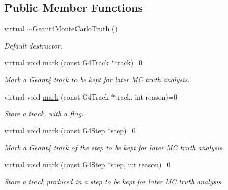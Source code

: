 \subsection*{Public Member Functions}
\begin{DoxyCompactItemize}
\item 
virtual \hyperlink{class_d_d4hep_1_1_simulation_1_1_geant4_monte_carlo_truth_acc1f5693c904777e8470b7df290d1c2c}{$\sim$Geant4MonteCarloTruth} ()
\begin{DoxyCompactList}\small\item\em Default destructor. \item\end{DoxyCompactList}\item 
virtual void \hyperlink{class_d_d4hep_1_1_simulation_1_1_geant4_monte_carlo_truth_ad74253c38fb6e00003b591a07e5e748d}{mark} (const G4Track $\ast$track)=0
\begin{DoxyCompactList}\small\item\em Mark a Geant4 track to be kept for later MC truth analysis. \item\end{DoxyCompactList}\item 
virtual void \hyperlink{class_d_d4hep_1_1_simulation_1_1_geant4_monte_carlo_truth_a6b63ab3d0ac424aba1088fb9ea2994dc}{mark} (const G4Track $\ast$track, int reason)=0
\begin{DoxyCompactList}\small\item\em Store a track, with a flag. \item\end{DoxyCompactList}\item 
virtual void \hyperlink{class_d_d4hep_1_1_simulation_1_1_geant4_monte_carlo_truth_a6aa3674a7c9e2f0132251bf05c7dab88}{mark} (const G4Step $\ast$step)=0
\begin{DoxyCompactList}\small\item\em Mark a Geant4 track of the step to be kept for later MC truth analysis. \item\end{DoxyCompactList}\item 
virtual void \hyperlink{class_d_d4hep_1_1_simulation_1_1_geant4_monte_carlo_truth_aaa3fb07338363616c0a898d791d24314}{mark} (const G4Step $\ast$step, int reason)=0
\begin{DoxyCompactList}\small\item\em Store a track produced in a step to be kept for later MC truth analysis. \item\end{DoxyCompactList}\end{DoxyCompactItemize}
